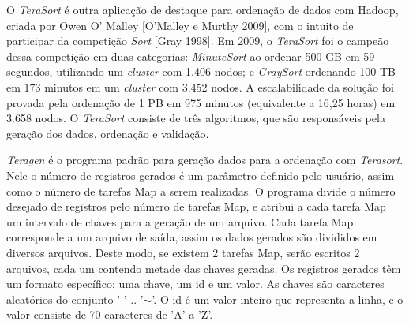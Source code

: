 %
%
%
%





O \textit{TeraSort} é outra aplicação de destaque para ordenação de dados com Hadoop, criada por Owen O' Malley [O'Malley e Murthy 2009], com o intuito de participar da competição \textit{Sort} [Gray 1998]. Em 2009, o \textit{TeraSort} foi o campeão dessa competição em duas categorias: \textit{MinuteSort} ao ordenar 500 GB em 59 segundos, utilizando um \textit{cluster} com 1.406 nodos; e \textit{GraySort} ordenando 100 TB em 173 minutos em um \textit{cluster} com 3.452 nodos. A escalabilidade da solução foi provada pela ordenação de 1 PB em 975 minutos (equivalente a 16,25 horas) em 3.658 nodos.
O \textit{TeraSort} consiste de três algoritmos, que são responsáveis pela geração dos dados, ordenação e validação. 

\textit{Teragen} é o programa padrão para geração dados para a ordenação com \textit{Terasort}.
Nele o número de registros gerados é um parâmetro definido pelo usuário, assim como o número de tarefas Map a serem realizadas. O programa divide o número desejado de registros pelo número de tarefas Map, e atribui a cada tarefa Map um intervalo de chaves para a geração de um arquivo. Cada tarefa Map corresponde a um arquivo de saída, assim os dados gerados são divididos em diversos arquivos. Deste modo, se existem 2 tarefas Map, serão escritos 2 arquivos, cada um contendo metade das chaves geradas. 
Os registros gerados têm um formato específico: uma chave, um id e um valor. As  chaves são caracteres aleatórios do conjunto ' ' .. '$\sim$'. O id é um valor inteiro que representa a linha, e o valor consiste de 70 caracteres de 'A' a 'Z'. 

